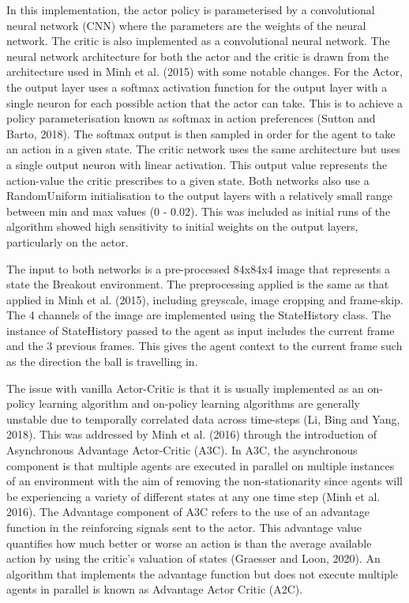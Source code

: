 \documentclass{article}
\begin{document}
In this implementation, the actor policy is parameterised by a convolutional neural network (CNN) where the parameters are the weights of the neural network. The critic is also implemented as a convolutional neural network. The neural network architecture for both the actor and the critic is drawn from the architecture used in Minh et al. (2015) with some notable changes. For the Actor, the output layer uses a softmax activation function for the output layer with a single neuron for each possible action that the actor can take. This is to achieve a policy parameterisation known as softmax in action preferences (Sutton and Barto, 2018). The softmax output is then sampled in order for the agent to take an action in a given state. The critic network uses the same architecture but uses a single output neuron with linear activation. This output value represents the action-value the critic prescribes to a given state. Both networks also use a RandomUniform initialisation to the output layers with a relatively small range between min and max values (0 - 0.02). This was included as initial runs of the algorithm showed high sensitivity to initial weights on the output layers, particularly on the actor.

The input to both networks is a pre-processed 84x84x4 image that represents a state the Breakout environment. The preprocessing applied is the same as that applied in Minh et al. (2015), including greyscale, image cropping and frame-skip. The 4 channels of the image are implemented using the StateHistory class. The instance of StateHistory passed to the agent as input includes the current frame and the 3 previous frames. This gives the agent context to the current frame such as the direction the ball is travelling in.

The issue with vanilla Actor-Critic is that it is usually implemented as an on-policy learning algorithm and on-policy learning algorithms are generally unstable due to temporally correlated data across time-steps (Li, Bing and Yang, 2018). This was addressed by Minh et al. (2016) through the introduction of Asynchronous Advantage Actor-Critic (A3C). In A3C, the asynchronous component is that multiple agents are executed in parallel on multiple instances of an environment with the aim of removing the non-stationarity since agents will be experiencing a variety of different states at any one time step (Minh et al. 2016). The Advantage component of A3C refers to the use of an advantage function in the reinforcing signals sent to the actor. This advantage value quantifies how much better or worse an action is than the average available action by using the critic's valuation of states (Graesser and Loon, 2020). An algorithm that implements the advantage function but does not execute multiple agents in parallel is known as Advantage Actor Critic (A2C).
\end{document}
